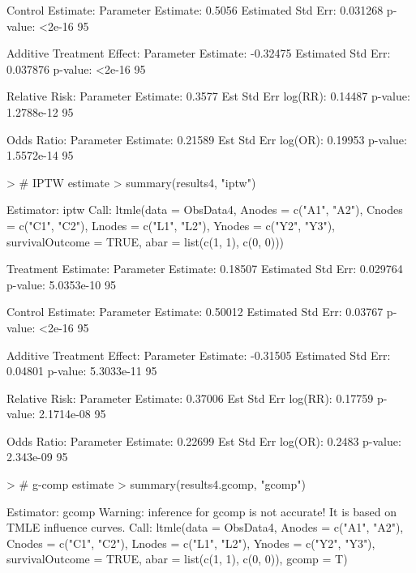 \documentclass{exam}
\begin{document}
\begin{solution}
\begin{Schunk}
\begin{Soutput}
Control Estimate:
   Parameter Estimate:  0.5056 
    Estimated Std Err:  0.031268 
              p-value:  <2e-16 
    95%

Additive Treatment Effect:
   Parameter Estimate:  -0.32475 
    Estimated Std Err:  0.037876 
              p-value:  <2e-16 
    95%

Relative Risk:
   Parameter Estimate:  0.3577 
  Est Std Err log(RR):  0.14487 
              p-value:  1.2788e-12 
    95%

Odds Ratio:
   Parameter Estimate:  0.21589 
  Est Std Err log(OR):  0.19953 
              p-value:  1.5572e-14 
    95%
\end{Soutput}
\end{Schunk}
\begin{Schunk}
\begin{Sinput}
> # IPTW estimate
> summary(results4, "iptw")
\end{Sinput}
\begin{Soutput}
Estimator:  iptw 
Call:
ltmle(data = ObsData4, Anodes = c("A1", "A2"), Cnodes = c("C1", 
    "C2"), Lnodes = c("L1", "L2"), Ynodes = c("Y2", "Y3"), survivalOutcome = TRUE, 
    abar = list(c(1, 1), c(0, 0)))

Treatment Estimate:
   Parameter Estimate:  0.18507 
    Estimated Std Err:  0.029764 
              p-value:  5.0353e-10 
    95%

Control Estimate:
   Parameter Estimate:  0.50012 
    Estimated Std Err:  0.03767 
              p-value:  <2e-16 
    95%

Additive Treatment Effect:
   Parameter Estimate:  -0.31505 
    Estimated Std Err:  0.04801 
              p-value:  5.3033e-11 
    95%

Relative Risk:
   Parameter Estimate:  0.37006 
  Est Std Err log(RR):  0.17759 
              p-value:  2.1714e-08 
    95%

Odds Ratio:
   Parameter Estimate:  0.22699 
  Est Std Err log(OR):  0.2483 
              p-value:  2.343e-09 
    95%
\end{Soutput}
\end{Schunk}
\begin{Schunk}
\begin{Sinput}
> # g-comp estimate
> summary(results4.gcomp, "gcomp")
\end{Sinput}
\begin{Soutput}
Estimator:  gcomp 
Warning: inference for gcomp is not accurate! It is based on TMLE influence curves.
Call:
ltmle(data = ObsData4, Anodes = c("A1", "A2"), Cnodes = c("C1", 
    "C2"), Lnodes = c("L1", "L2"), Ynodes = c("Y2", "Y3"), survivalOutcome = TRUE, 
    abar = list(c(1, 1), c(0, 0)), gcomp = T)


\end{Soutput}
\end{Schunk}
\end{solution}
\end{document}
